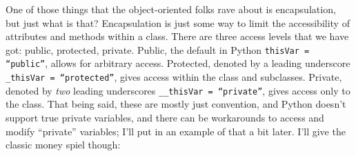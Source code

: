 \documentclass[12pt, twoside, reqno]{book}
\begin{document}
One of those things that the object-oriented folks rave about is encapsulation, but just what is that? Encapsulation is just some way to limit the accessibility of attributes and methods within a class. There are three access levels that we have got: public, protected, private. Public, the default in Python \texttt{thisVar = ``public''}, allows for arbitrary access. Protected, denoted by a leading underscore \texttt{\_thisVar = ``protected''}, gives access within the class and subclasses. Private, denoted by \textit{two} leading underscores \texttt{\_\_thisVar = ``private''}, gives access only to the class. That being said, these are mostly just convention, and Python doesn't support true private variables, and there can be workarounds to access and modify ``private'' variables; I'll put in an example of that a bit later. I'll give the classic money spiel though:
\end{document}
